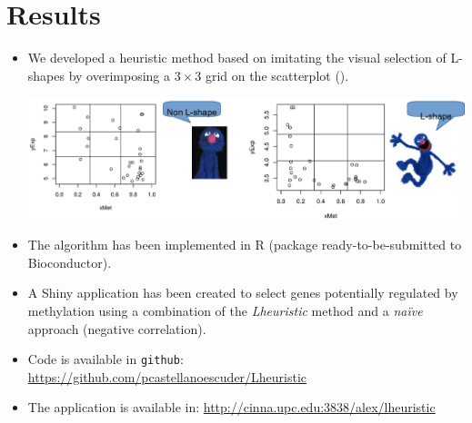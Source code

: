 \section{Results}
\begin{itemize}
	\item We developed a heuristic method based on imitating the visual selection of L-shapes by overimposing a $3\times 3$ grid on the scatterplot (\cite{sanchez:2019}).
	
	\begin{center}
		\includegraphics[width=\columnwidth]{./images/LshapeVsnonLshape.png}
	\end{center}
	
	\item The algorithm has been implemented in R (package ready-to-be-submitted to Bioconductor).
	\item A Shiny application has been created to select genes potentially regulated by methylation using a combination of the \textit{Lheuristic} method and a \textit{naïve} approach (negative correlation).
	\item Code is available in \texttt{github}:\newline
	\url{https://github.com/pcastellanoescuder/Lheuristic}
	\item The application is available in:\newline
	\url{http://cinna.upc.edu:3838/alex/lheuristic}
	
\end{itemize}
